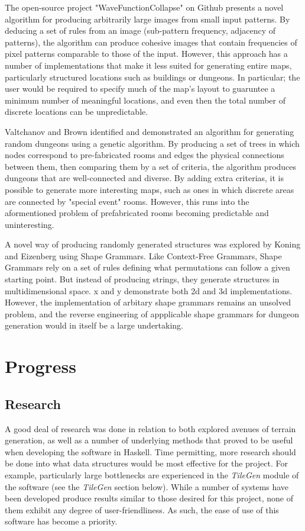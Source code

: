\documentclass{article}
\begin{document}
The open-source project "WaveFunctionCollapse" on Github presents a novel algorithm for producing arbitrarily large images from small input patterns.\cite{wfc-report} By deducing a set of rules from an image (sub-pattern frequency, adjacency of patterns), the algorithm can produce cohesive images that contain frequencies of pixel patterns comparable to those of the input. However, this approach has a number of implementations that make it less suited for generating entire maps, particularly structured locations such as buildings or dungeons. In particular; the user would be required to specify much of the map's layout to guaruntee a minimum number of meaningful locations, and even then the total number of discrete locations can be unpredictable.



Valtchanov and Brown identified and demonstrated an algorithm for generating random dungeons using a genetic algorithm\cite{genetic}. By producing a set of trees in which nodes correspond to pre-fabricated rooms and edges the physical connections between them, then comparing them by a set of criteria, the algorithm produces dungeons that are well-connected and diverse. By adding extra criterias, it is possible to generate more interesting maps, such as ones in which discrete areas are connected by "special event" rooms. However, this runs into the aformentioned problem of prefabricated rooms becoming predictable and uninteresting.



A novel way of producing randomly generated structures was explored by Koning and Eizenberg using Shape Grammars.\cite{koning1981language} Like Context-Free Grammars, Shape Grammars rely on a set of rules defining what permutations can follow a given starting point. But instead of producing strings, they generate structures in multidimensional space. x and y demonstrate both 2d and 3d implementations. However, the implementation of arbitary shape grammars remains an unsolved problem, and the reverse engineering of appplicable shape grammars for dungeon generation would in itself be a large undertaking.

\section{Progress}

\subsection{Research}
A good deal of research was done in relation to both explored avenues of terrain generation, as well as a number of underlying methods that proved to be useful when developing the software in Haskell. Time permitting, more research should be done into what data structures would be most effective for the project. For example, particularly large bottlenecks are experienced in the \textit{TileGen} module of the software (see the \textit{TileGen} section below). While a number of systems have been developed produce results similar to those desired for this project, none of them exhibit any degree of user-friendliness. As such, the ease of use of this software has become a priority.
\end{document}
